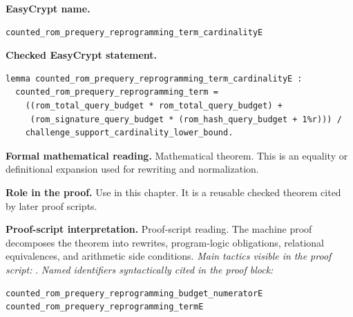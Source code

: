 \begin{formaltheorem}
\noindent\textbf{EasyCrypt name.}
\begin{lstlisting}[language=EasyCrypt,basicstyle=\ttfamily\scriptsize]
counted_rom_prequery_reprogramming_term_cardinalityE
\end{lstlisting}
\noindent\textbf{Checked EasyCrypt statement.}
\begin{lstlisting}[language=EasyCrypt,basicstyle=\ttfamily\scriptsize]
lemma counted_rom_prequery_reprogramming_term_cardinalityE :
  counted_rom_prequery_reprogramming_term =
    ((rom_total_query_budget * rom_total_query_budget) +
     (rom_signature_query_budget * (rom_hash_query_budget + 1%r))) /
    challenge_support_cardinality_lower_bound.
\end{lstlisting}
\noindent\textbf{Formal mathematical reading.}
Mathematical theorem. This is an equality or definitional expansion used for rewriting and normalization.

\noindent\textbf{Role in the proof.}
Use in this chapter. It is a reusable checked theorem cited by later proof scripts.

\noindent\textbf{Proof-script interpretation.}
Proof-script reading. The machine proof decomposes the theorem into rewrites, program-logic obligations, relational equivalences, and arithmetic side conditions.
\emph{Main tactics visible in the proof script:} .
\emph{Named identifiers syntactically cited in the proof block:}
\begin{lstlisting}[language=EasyCrypt,basicstyle=\ttfamily\scriptsize]
counted_rom_prequery_reprogramming_budget_numeratorE
counted_rom_prequery_reprogramming_termE
\end{lstlisting}

\end{formaltheorem}

